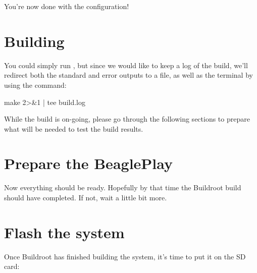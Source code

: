 You're now done with the configuration!

\section{Building}

You could simply run , but since we would like to keep a
log of the build, we'll redirect both the standard and error outputs
to a file, as well as the terminal by using the  command:

\begin{bashinput}
make 2>&1 | tee build.log
\end{bashinput}

While the build is on-going, please go through the following sections
to prepare what will be needed to test the build results.

\section{Prepare the BeaglePlay}





Now everything should be ready. Hopefully by that time the Buildroot
build should have completed. If not, wait a little bit more.

\section{Flash the system}

Once Buildroot has finished building the system, it's time to put it
on the SD card:


